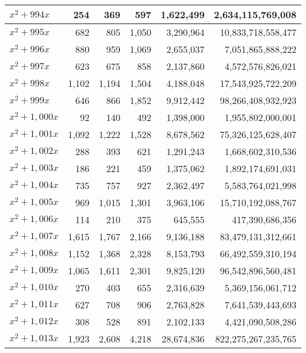 \documentclass[a4paper]{amsproc}
\theoremstyle{plain}
\begin{document}
\begin{longtable}{ | l | r | r | r | r | r | }
$x^2 + 994x$ & 254 & 369 & 597 & 1{,}622{,}499 & 2{,}634{,}115{,}769{,}008 \\ \hline
$x^2 + 995x$ & 682 & 805 & 1{,}050 & 3{,}290{,}964 & 10{,}833{,}718{,}558{,}477 \\ \hline
$x^2 + 996x$ & 880 & 959 & 1{,}069 & 2{,}655{,}037 & 7{,}051{,}865{,}888{,}222 \\ \hline
$x^2 + 997x$ & 623 & 675 & 858 & 2{,}137{,}860 & 4{,}572{,}576{,}826{,}021 \\ \hline
$x^2 + 998x$ & 1{,}102 & 1{,}194 & 1{,}504 & 4{,}188{,}048 & 17{,}543{,}925{,}722{,}209 \\ \hline
$x^2 + 999x$ & 646 & 866 & 1{,}852 & 9{,}912{,}442 & 98{,}266{,}408{,}932{,}923 \\ \hline
$x^2 + 1{,}000x$ & 92 & 140 & 492 & 1{,}398{,}000 & 1{,}955{,}802{,}000{,}001 \\ \hline
$x^2 + 1{,}001x$ & 1{,}092 & 1{,}222 & 1{,}528 & 8{,}678{,}562 & 75{,}326{,}125{,}628{,}407 \\ \hline
$x^2 + 1{,}002x$ & 288 & 393 & 621 & 1{,}291{,}243 & 1{,}668{,}602{,}310{,}536 \\ \hline
$x^2 + 1{,}003x$ & 186 & 221 & 459 & 1{,}375{,}062 & 1{,}892{,}174{,}691{,}031 \\ \hline
$x^2 + 1{,}004x$ & 735 & 757 & 927 & 2{,}362{,}497 & 5{,}583{,}764{,}021{,}998 \\ \hline
$x^2 + 1{,}005x$ & 969 & 1{,}015 & 1{,}301 & 3{,}963{,}106 & 15{,}710{,}192{,}088{,}767 \\ \hline
$x^2 + 1{,}006x$ & 114 & 210 & 375 & 645{,}555 & 417{,}390{,}686{,}356 \\ \hline
$x^2 + 1{,}007x$ & 1{,}615 & 1{,}767 & 2{,}166 & 9{,}136{,}188 & 83{,}479{,}131{,}312{,}661 \\ \hline
$x^2 + 1{,}008x$ & 1{,}152 & 1{,}368 & 2{,}328 & 8{,}153{,}793 & 66{,}492{,}559{,}310{,}194 \\ \hline
$x^2 + 1{,}009x$ & 1{,}065 & 1{,}611 & 2{,}301 & 9{,}825{,}120 & 96{,}542{,}896{,}560{,}481 \\ \hline
$x^2 + 1{,}010x$ & 270 & 403 & 655 & 2{,}316{,}639 & 5{,}369{,}156{,}061{,}712 \\ \hline
$x^2 + 1{,}011x$ & 627 & 708 & 906 & 2{,}763{,}828 & 7{,}641{,}539{,}443{,}693 \\ \hline
$x^2 + 1{,}012x$ & 308 & 528 & 891 & 2{,}102{,}133 & 4{,}421{,}090{,}508{,}286 \\ \hline
$x^2 + 1{,}013x$ & 1{,}923 & 2{,}608 & 4{,}218 & 28{,}674{,}836 & 822{,}275{,}267{,}235{,}765 \\ \hline

\end{longtable}
\end{document}
